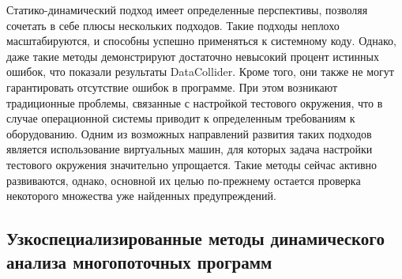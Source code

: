 Статико-динамический подход имеет определенные перспективы, позволяя сочетать в себе плюсы нескольких подходов.
Такие подходы неплохо масштабируются, и способны успешно применяться к системному коду.
Однако, даже такие методы демонстрируют достаточно невысокий процент истинных ошибок, что показали результаты DataCollider.
Кроме того, они также не могут гарантировать отсутствие ошибок в программе.
При этом возникают традиционные проблемы, связанные с настройкой тестового окружения, что в случае операционной системы приводит к определенным требованиям к оборудованию.
Одним из возможных направлений развития таких подходов является использование виртуальных машин, для которых задача настройки тестового окружения значительно упрощается. 
Такие методы сейчас активно развиваются, однако, основной их целью по-прежнему остается проверка некоторого множества уже найденных предупреждений.



\subsection{Узкоспециализированные методы динамического анализа многопоточных программ}

